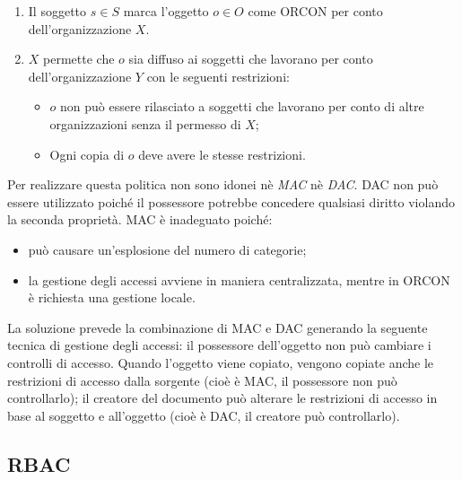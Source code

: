 \begin{enumerate}
      \item Il soggetto \(s \in S\) marca l'oggetto \(o \in O\) come ORCON per
            conto dell'organizzazione \(X\).
      \item \(X\) permette che \(o\) sia diffuso ai soggetti che lavorano per
            conto dell'organizzazione \(Y\) con le seguenti restrizioni:
            \begin{itemize}
                  \item \(o\) non può essere rilasciato a soggetti che lavorano per
                        conto di altre organizzazioni senza il permesso di \(X\);
                  \item Ogni copia di \(o\) deve avere le stesse restrizioni.
            \end{itemize}
\end{enumerate}

Per realizzare questa politica non sono idonei nè \textit{MAC} nè \textit{DAC}.
DAC non può essere utilizzato poiché il possessore potrebbe concedere qualsiasi
diritto violando la seconda proprietà.
MAC è inadeguato poiché:

\begin{itemize}
      \item può causare un'esplosione del numero di categorie;
      \item la gestione degli accessi avviene in maniera centralizzata,
            mentre in ORCON è richiesta
            una gestione locale.
\end{itemize}

La soluzione prevede la combinazione di MAC e DAC generando la seguente tecnica
di gestione degli accessi: il possessore dell'oggetto non può cambiare i
controlli di accesso. Quando l'oggetto
viene copiato, vengono copiate anche le restrizioni di accesso dalla sorgente
(cioè è MAC, il possessore non può controllarlo); il creatore del documento può
alterare le restrizioni di accesso in base al soggetto e all'oggetto
(cioè è DAC, il creatore può controllarlo).

\subsection{RBAC}

